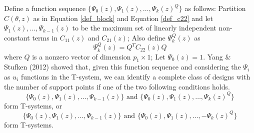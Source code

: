 \documentclass[12pt]{TD-CJS}
\begin{document}
Define a function sequence $\{\Psi_0(z),\Psi_1(z),\ldots, \Psi_k(z)^Q\}$ as follows: Partition $C(\theta,z)$ as in Equation \eqref{def_block} and Equation \eqref{def_c22} and let $\Psi_1(z),\ldots,\Psi_{k-1}(z)$ to be the maximum set of linearly independent non-constant terms in $C_{11}(z)$ and $C_{21}(z)$; Also define $\Psi^Q_{k}(z)$ as \[\Psi_k^Q(z) = Q^TC_{22}(z)Q\] where $Q$ is a nonzero vector of dimension $p_1\times 1$; Let $\Psi_0(z) = 1$. Yang \& Stufken (2012) showed that, given this function sequence  and considering the $\Psi_i$ as $u_i$ functions in the T-system, we can identify a complete class of designs with the number of support points if one of the two following conditions holds. %
\begin{equation}
    \{\Psi_0(z),\Psi_1(z),\ldots, \Psi_{k-1}(z)\} \text{ and }  \{\Psi_0(z),\Psi_1(z),\ldots, \Psi_k(z)^Q\}
    \label{eq: 3.5}
\end{equation} form T-systems, or\begin{equation}\label{eq: 3.6}
    \{\Psi_0(z),\Psi_1(z),\ldots,\Psi_{k-1}(z)\} \text{ and }  \{\Psi_0(z),\Psi_1(z),\ldots, -\Psi_k(z)^Q\} 
\end{equation}
     form T-systems. 
\end{document}
